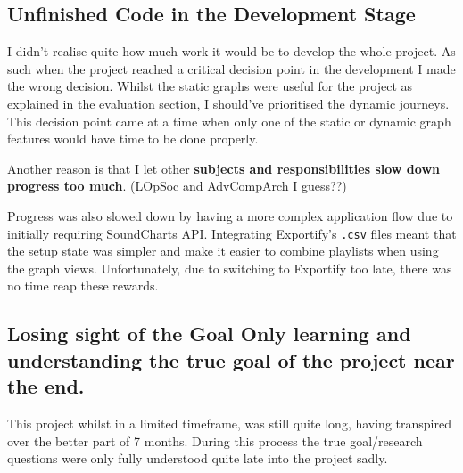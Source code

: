 \subsection{Unfinished Code in the Development Stage}
I didn't realise quite how much work it would be to develop the whole project. As such when the project reached a critical decision point in the development I made the wrong decision. Whilst the static graphs were useful for the project as explained in the evaluation section, I should've prioritised the dynamic journeys. This decision point came at a time when only one of the static or dynamic graph features would have time to be done properly.

Another reason is that I let other \textbf{subjects and responsibilities slow down progress too much}. (LOpSoc and AdvCompArch I guess??)

Progress was also slowed down by having a more complex application flow due to initially requiring SoundCharts API. Integrating Exportify's \lstinline|.csv| files meant that the setup state was simpler and make it easier to combine playlists when using the graph views. Unfortunately, due to switching to Exportify too late, there was no time reap these rewards.

\subsection{
    Losing sight of the Goal
    Only learning and understanding the true goal of the project near the end.
}%

This project whilst in a limited timeframe, was still quite long, having transpired over the better part of 7 months. During this process the true goal/research questions were only fully understood quite late into the project sadly.

